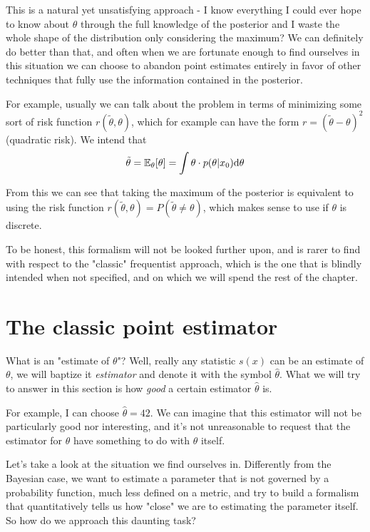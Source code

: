 This is a natural yet unsatisfying approach - I know everything I could ever hope to know about $\theta$ through the full knowledge of the posterior and I waste the whole shape of the distribution only considering the maximum? We can definitely do better than that, and often when we are fortunate enough to find ourselves in this situation we can choose to abandon point estimates entirely in favor of other techniques that fully use the information contained in the posterior. 

For example, usually we can talk about the problem in terms of minimizing some sort of risk function $r(\tilde{\theta},\theta)$, which for example can have the form $r = (\tilde{\theta}-\theta)^2$ (quadratic risk). We intend that
	\[
	\tilde{\theta} = \mathbb{E}_\theta[\theta] = \int\theta\cdot p(\theta|x_0)\mathrm{d} \theta
	\]

From this we can see that taking the maximum of the posterior is equivalent to using the risk function $r(\tilde{\theta},\theta)=P(\tilde{\theta}\neq\theta)$, which makes sense to use if $\theta$ is discrete. 

To be honest, this formalism will not be looked further upon, and is rarer to find with respect to the "classic" frequentist approach, which is the one that is blindly intended when not specified, and on which we will spend the rest of the chapter.

\section{The classic point estimator}

What is an "estimate of $\theta$"? Well, really any statistic $s(x)$ can be an estimate of $\theta$, we will baptize it \emph{estimator} and denote it with the symbol $\hat{\theta}$. What we will try to answer in this section is how \emph{good} a certain estimator $\hat{\theta}$ is.

For example, I can choose $\hat{\theta}=42$. We can imagine that this estimator will not be particularly good nor interesting, and it's not unreasonable to request that the estimator for $\theta$ have something to do with $\theta$ itself.

Let's take a look at the situation we find ourselves in. Differently from the Bayesian case, we want to estimate a parameter that is not governed by a probability function, much less defined on a metric, and try to build a formalism that quantitatively tells us how "close" we are to estimating the parameter itself. So how do we approach this daunting task?


